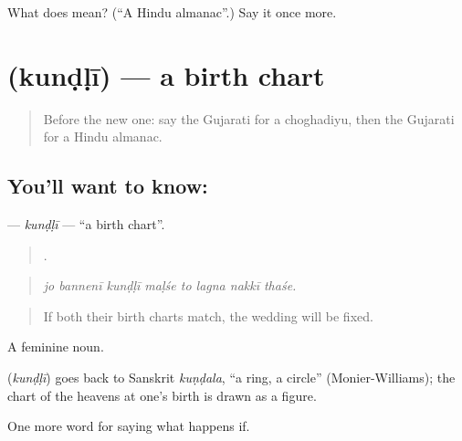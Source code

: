 \begin{tcolorbox}[breakable,colback=teal!4,colframe=teal!35!black,title={Before you move on}]
What does  mean? (\textquotedblleft{}A Hindu almanac\textquotedblright{}.) Say it once more.
\end{tcolorbox}
\section[\texorpdfstring{\gu{કુંડળી} (kunḍḷī)}{કુંડળી (kunḍḷī)}]{ (kunḍḷī) — a birth chart}

\label{lesson:GU-C536-kundli}



\begin{quote}
Before the new one: say the Gujarati for a choghadiyu, then the Gujarati for a Hindu almanac.
\end{quote}

\subsection*{You'll want to know: }
\textbf{} — \emph{kunḍḷī} — \textquotedblleft{}a birth chart\textquotedblright{}.

\begin{quote}
       .
\end{quote}

\begin{quote}
\emph{jo bannenī kunḍḷī maḷśe to lagna nakkī thaśe.}
\end{quote}

\begin{quote}
If both their birth charts match, the wedding will be fixed.
\end{quote}

A feminine noun.

\begin{cousinweb}
\textbf{} (\emph{kunḍḷī}) goes back to Sanskrit \emph{kuṇḍala}, \textquotedblleft{}a ring, a circle\textquotedblright{} (Monier-Williams); the chart of the heavens at one's birth is drawn as a figure.
\end{cousinweb}

\begin{grammarlens}[title={What you've built}]
One more word for saying what happens if.
\end{grammarlens}

